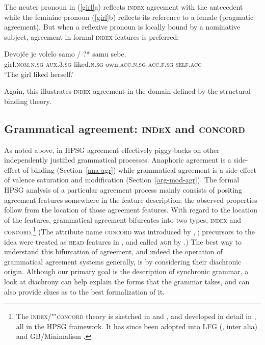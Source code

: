 \documentclass[output=paper,biblatex,babelshorthands,newtxmath,draftmode,colorlinks,citecolor=brown]{langscibook}
\begin{document}
\noindent
The neuter pronoun in (\ref{girl}a) reflects \textsc{index} agreement
with the antecedent while the feminine pronoun (\ref{girl}b) reflects its reference to a female (pragmatic agreement).  But when a reflexive pronoun is locally bound  by a nominative subject, agreement in  formal \textsc{index} features is preferred:

\begin{exe}
\ex \label{girl2}
\gll 	Devojče            je               volelo              samo                  /  ?* samu              sebe. \\
        girl.\textsc{nom.n.sg} \textsc{aux.3.sg} liked.\textsc{n.sg} own.\textsc{acc.n.sg} {} {} \textsc{acc.f.sg} \textsc{self}.\textsc{acc} \\
\glt `The girl liked herself.'
\end{exe}

\noindent
Again, this illustrates \textsc{index} agreement in the domain defined by the structural binding theory.



\subsection{Grammatical agreement: \textsc{index} and \textsc{concord}}
\label{ind-con}\label{agreement-sec-index-concord}

\largerpage
As noted above, in HPSG agreement effectively piggy-backs on other independently justified
grammatical processes.  Anaphoric agreement is a side-effect of binding (Section~\ref{ana-agr})
while grammatical agreement is a side-effect of valence saturation and modification
(Section~\ref{arg-mod-agr}).  The formal HPSG analysis of a particular agreement process mainly
consists of positing agreement features somewhere in the feature description; the observed
properties follow from the location of those agreement features.  With regard to the location of the
features, grammatical agreement bifurcates into two types, \textsc{index} and
\textsc{concord}.\footnote{The \textsc{index}/""\textsc{concord} theory is sketched in
  \citet[Chapter~2]{Pollard+Sag:1994} and \citet{Kathol99b}, and developed in detail in
  \citet{Wechsler+Zlatic:2000,Wechsler+Zlatic:2003}, all in the HPSG framework.  It has since been
  adopted into LFG (\citealt{king+dalrymple:2004}, inter alia) and GB/Minimalism
  \citep{Danon:2009}.}  (The attribute name \textsc{concord} was introduced by
\citealt[799]{Wechsler+Zlatic:2000}, \citealt[14]{Wechsler+Zlatic:2003}; precursors to the idea were
treated as \textsc{head} features in \citealt[Section~2.5.1]{Pollard+Sag:1994}, and called
\textsc{agr} by \citealt{Kathol99b}.)  The best way to understand this bifurcation of agreement, and
indeed the operation of grammatical agreement systems generally, is by considering their
diachronic origin.  Although our primary goal is the description of synchronic
grammar, a look at diachrony can help explain the forms that the grammar takes, and can also provide
clues as to the best formalization of it.
\end{document}

